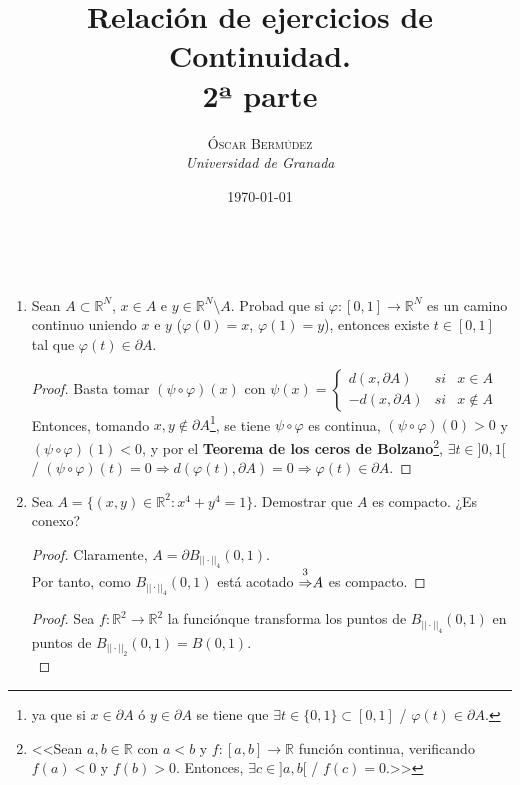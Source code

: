 \documentclass[a4paper, 11pt]{article} %
\title{\textbf{Relación de ejercicios de Continuidad.}\\ %
2ª parte} %
\author{\textsc{Óscar Bermúdez} %
\\{\textit{Universidad de Granada}}} %
\date{\today} %
\makeatletter
\renewcommand{\maketitle}{ %
\begin{flushright} %
{\LARGE\@title} %

\vspace{50pt} %

{\large\@author} %
\\\@date %

\vspace{40pt} %
\end{flushright}
}
\makeatother
\begin{document}
\maketitle %

\begin{enumerate}
	\item Sean $A \subset \mathbb{R}^N$, $x \in A$ e $y \in \mathbb{R}^N \setminus A$. Probad que si $\varphi: [0,1] \rightarrow \mathbb{R}^N$ es un camino continuo uniendo $x$ e $y$ ($\varphi(0) = x$, $\varphi(1) = y$), entonces existe $t \in [0,1]$ tal que $\varphi(t) \in \partial A$.
	\begin{proof}
		Basta tomar $(\psi \circ \varphi)(x)$ con
		$\psi(x) = \left\{ \begin{array}{ccc}
							d(x,\partial A) &   si  & x \in A \\
							-d(x, \partial A) &  si & x \notin A
						\end{array}\right.$\\
		Entonces, tomando $x,y \notin \partial A$\footnote{ya que si $x \in \partial A$ ó $y \in \partial A$ se tiene que $\exists t \in \{0,1\} \subset [0,1]$ / $\varphi(t) \in \partial A$.}, se tiene $\psi \circ \varphi$ es continua, $(\psi \circ \varphi)(0) > 0$ y $(\psi \circ \varphi)(1) < 0$, y por el \textbf{Teorema de los ceros de Bolzano}\footnote{<<Sean $a, b \in \mathbb{R}$ con $a < b$ y $f: [a,b] \rightarrow \mathbb{R}$ función continua, verificando $f(a) < 0$ y $f(b) > 0$. Entonces, $\exists c \in ]a,b[$ / $f(c) = 0$.>>}, $\exists t \in ]0,1[$ / $(\psi \circ \varphi)(t) = 0 \Rightarrow d(\varphi(t), \partial A) = 0 \Rightarrow \varphi(t) \in \partial A$.
	\end{proof}
	\item Sea $A = \{(x,y) \in \mathbb{R}^2: x^4 + y^4 = 1\}$. Demostrar que $A$ es compacto. ¿Es conexo?
	\begin{proof}
		Claramente, $A = \partial B_{||\cdot||_4}(0,1)$.\\
		Por tanto, como $B_{||\cdot||_4}(0,1)$ está acotado $\accentset{\footnotemark[3]} \Rightarrow A$ es compacto.
	\end{proof}
	\begin{proof}
		Sea $f: \mathbb{R}^2 \rightarrow \mathbb{R}^2$ la función\footnotemark[4] que transforma los puntos de $B_{||\cdot||_4}(0,1)$ en puntos de $B_{||\cdot||_2}(0,1) = B(0,1)$.\\
\end{proof}
\end{enumerate}
\end{document}
